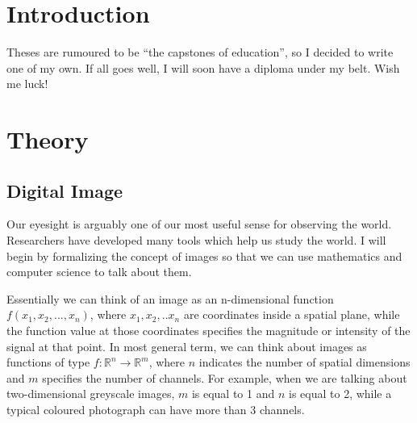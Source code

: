 \documentclass[
  digital,     %
  oneside,     %
  nosansbold,  %
  nocolorbold, %
  lof,         %
  lot,         %
]{fithesis4}
\newcommand*{\R}{\ensuremath{\mathbb{R}}}
\begin{document}
\chapter*{Introduction}

Theses are rumoured to be \enquote{the capstones of education}, so
I decided to write one of my own. If all goes well, I will soon
have a diploma under my belt. Wish me luck!

\chapter{Theory}

\section{Digital Image}

Our eyesight is arguably one of our most useful sense for observing the world.
Researchers have developed many tools which help us study the world. I will
begin by formalizing the concept of images so that we can use mathematics
and computer science to talk about them.

Essentially we can think of an image as an n-dimensional function $f(x_1, x_2,
..., x_n)$, where $x_1, x_2, .. x_n$ are coordinates inside a spatial plane,
while the function value at those coordinates specifies the magnitude or intensity
of the signal at that point. In most general term, we can think about images as
functions of type $f:\R^n \rightarrow \R^m$, where $n$ indicates the number of
spatial dimensions and $m$ specifies the number of channels. For example, when
we are talking about two-dimensional greyscale images, $m$ is equal to 1 and $n$ is
equal to 2, while a typical coloured photograph can have more than 3 channels.
\end{document}
